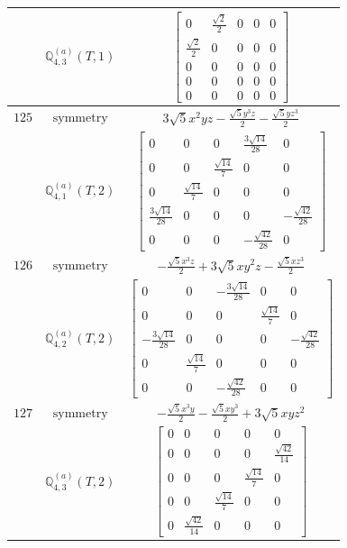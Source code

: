 \documentclass[fleqn,8pt,landscape]{jsarticle}
\begin{document}
\begin{longtable}{ccc}
$  $ & $ \mathbb{Q}_{4,3}^{(a)}(T,1) $ & $ \begin{bmatrix} 0 & \frac{\sqrt{2}}{2} & 0 & 0 & 0 \\ \frac{\sqrt{2}}{2} & 0 & 0 & 0 & 0 \\ 0 & 0 & 0 & 0 & 0 \\ 0 & 0 & 0 & 0 & 0 \\ 0 & 0 & 0 & 0 & 0 \end{bmatrix} $ \\ \hline
$ 125 $ & $ \text{symmetry} $ & $ 3 \sqrt{5} x^{2} y z - \frac{\sqrt{5} y^{3} z}{2} - \frac{\sqrt{5} y z^{3}}{2} $ \\
$  $ & $ \mathbb{Q}_{4,1}^{(a)}(T,2) $ & $ \begin{bmatrix} 0 & 0 & 0 & \frac{3 \sqrt{14}}{28} & 0 \\ 0 & 0 & \frac{\sqrt{14}}{7} & 0 & 0 \\ 0 & \frac{\sqrt{14}}{7} & 0 & 0 & 0 \\ \frac{3 \sqrt{14}}{28} & 0 & 0 & 0 & - \frac{\sqrt{42}}{28} \\ 0 & 0 & 0 & - \frac{\sqrt{42}}{28} & 0 \end{bmatrix} $ \\ \hline
$ 126 $ & $ \text{symmetry} $ & $ - \frac{\sqrt{5} x^{3} z}{2} + 3 \sqrt{5} x y^{2} z - \frac{\sqrt{5} x z^{3}}{2} $ \\
$  $ & $ \mathbb{Q}_{4,2}^{(a)}(T,2) $ & $ \begin{bmatrix} 0 & 0 & - \frac{3 \sqrt{14}}{28} & 0 & 0 \\ 0 & 0 & 0 & \frac{\sqrt{14}}{7} & 0 \\ - \frac{3 \sqrt{14}}{28} & 0 & 0 & 0 & - \frac{\sqrt{42}}{28} \\ 0 & \frac{\sqrt{14}}{7} & 0 & 0 & 0 \\ 0 & 0 & - \frac{\sqrt{42}}{28} & 0 & 0 \end{bmatrix} $ \\ \hline
$ 127 $ & $ \text{symmetry} $ & $ - \frac{\sqrt{5} x^{3} y}{2} - \frac{\sqrt{5} x y^{3}}{2} + 3 \sqrt{5} x y z^{2} $ \\
$  $ & $ \mathbb{Q}_{4,3}^{(a)}(T,2) $ & $ \begin{bmatrix} 0 & 0 & 0 & 0 & 0 \\ 0 & 0 & 0 & 0 & \frac{\sqrt{42}}{14} \\ 0 & 0 & 0 & \frac{\sqrt{14}}{7} & 0 \\ 0 & 0 & \frac{\sqrt{14}}{7} & 0 & 0 \\ 0 & \frac{\sqrt{42}}{14} & 0 & 0 & 0 \end{bmatrix} $ \\ \hline

\end{longtable}
\end{document}
